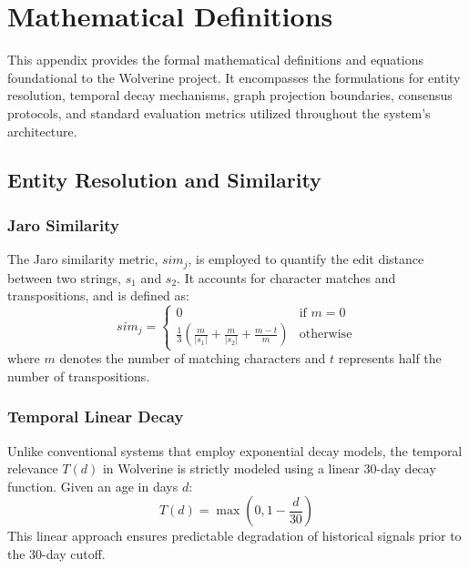 \chapter{Mathematical Definitions}
\label{app:math-definitions}

This appendix provides the formal mathematical definitions and equations foundational to the Wolverine project. It encompasses the formulations for entity resolution, temporal decay mechanisms, graph projection boundaries, consensus protocols, and standard evaluation metrics utilized throughout the system's architecture.

\section{Entity Resolution and Similarity}
\subsection{Jaro Similarity}
The Jaro similarity metric, $sim_{j}$, is employed to quantify the edit distance between two strings, $s_1$ and $s_2$. It accounts for character matches and transpositions, and is defined as:
\begin{equation}
sim_{j} = \begin{cases}
0 & \text{if } m = 0 \\
\frac{1}{3} \left( \frac{m}{|s_1|} + \frac{m}{|s_2|} + \frac{m - t}{m} \right) & \text{otherwise}
\end{cases}
\end{equation}
where $m$ denotes the number of matching characters and $t$ represents half the number of transpositions.

\subsection{Temporal Linear Decay}
Unlike conventional systems that employ exponential decay models, the temporal relevance $T(d)$ in Wolverine is strictly modeled using a linear 30-day decay function. Given an age in days $d$:
\begin{equation}
T(d) = \max\left(0, 1 - \frac{d}{30}\right)
\end{equation}
This linear approach ensures predictable degradation of historical signals prior to the 30-day cutoff.

